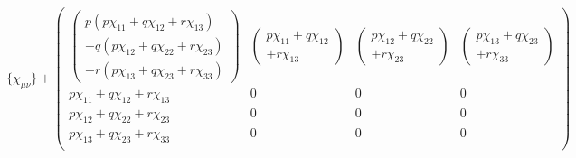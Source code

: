 \begin{equation}
\{\chi_{\mu\nu}\} + \left( \begin{array}{cccc}
\left(\begin{array}{c}p(p\chi_{11} + q\chi_{12} + r\chi_{13}) \\
+ q(p\chi_{12} + q\chi_{22} + r\chi_{23}) \\
+ r( p\chi_{13} + q\chi_{23} + r\chi_{33})  \end{array}\right)
&\left(\begin{array}{c} p\chi_{11} + q\chi_{12} \\+ r\chi_{13} \end{array}\right) &
\left(\begin{array}{c}  p\chi_{12} + q\chi_{22} \\ + r\chi_{23} \end{array} \right)&
\left(\begin{array}{c}  p\chi_{13} + q\chi_{23} \\
+ r\chi_{33}  \end{array}\right)  \\
p\chi_{11} + q\chi_{12} + r\chi_{13} & 0 & 0 & 0 \\
p\chi_{12} + q\chi_{22} + r\chi_{23} & 0 & 0 & 0 \\
 p\chi_{13} + q\chi_{23} + r\chi_{33} & 0 & 0 & 0 \\
\end{array} \right)
\label{87+1}
\end{equation}

